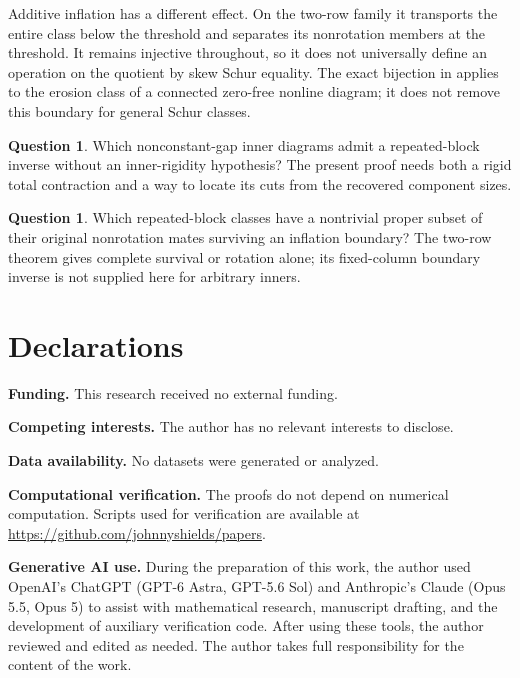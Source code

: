 \documentclass[11pt,a4paper]{amsart}
\numberwithin{equation}{section}
\theoremstyle{plain}
\theoremstyle{definition}
\newtheorem{question}[theorem]{Question}
\begin{document}
Additive inflation has a different effect.  On the two-row family it
transports the entire class below the threshold and separates its
nonrotation members at the threshold.  It remains injective throughout,
so it does not universally define an operation on the quotient by skew
Schur equality.
The exact bijection in  applies to the
erosion class of a connected zero-free nonline diagram; it does not
remove this boundary for general Schur classes.

\begin{question}\label{prob:nonconstant-inners}
Which nonconstant-gap inner diagrams admit a repeated-block inverse
without an inner-rigidity hypothesis?  The present proof needs both a
rigid total contraction and a way to locate its cuts from the recovered
component sizes.
\end{question}

\begin{question}\label{prob:inflation-survivors}
Which repeated-block classes have a nontrivial proper subset of their
original nonrotation mates surviving an inflation boundary?  The two-row
theorem gives complete survival or rotation alone; its fixed-column
boundary inverse is not supplied here for arbitrary inners.
\end{question}

\section*{Declarations}

{\footnotesize
\noindent\textbf{Funding.} This research received no external funding.

\smallskip
\noindent\textbf{Competing interests.} The author has no relevant interests to disclose.

\smallskip
\noindent\textbf{Data availability.} No datasets were generated or analyzed.

\smallskip
\noindent\textbf{Computational verification.} The proofs do not depend on numerical computation.  Scripts used for verification are available at \url{https://github.com/johnnyshields/papers}.

\smallskip
\noindent\textbf{Generative AI use.} During the preparation of this work, the author used OpenAI's ChatGPT (GPT-6 Astra, GPT-5.6 Sol) and Anthropic's Claude (Opus 5.5, Opus 5) to assist with mathematical research, manuscript drafting, and the development of auxiliary verification code.  After using these tools, the author reviewed and edited as needed.  The author takes full responsibility for the content of the work.
\par}
\end{document}
